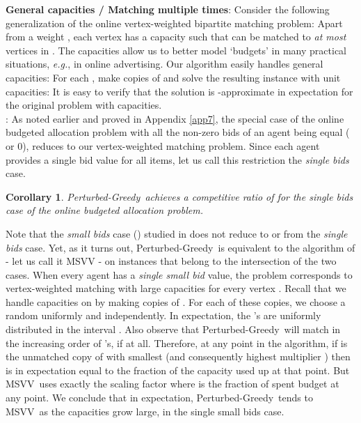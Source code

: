 \documentclass[11pt]{article}
\newtheorem{corollary}[theorem]{Corollary}
\newcommand{\MSVV}{MSVV}
\newcommand{\pgreedy}{{\sc Perturbed-Greedy}}
\begin{document}
\noindent \textbf{General capacities / Matching  multiple
  times}: Consider the following generalization of the online
vertex-weighted bipartite matching problem: Apart from a weight ,
each vertex  has a capacity  such that  can be
matched to \emph{at most}  vertices in . The capacities allow
us to better model `budgets' in many practical situations,
\textit{e.g.}, in online advertising. Our algorithm easily handles
general capacities: For each , make  copies of  and
solve the resulting instance with unit capacities: It is easy to
verify that the solution is -approximate
in expectation for the original problem with capacities.\\

: As noted earlier and proved in
Appendix \ref{app7}, the special case of the online budgeted
allocation problem with all the non-zero bids of an agent being equal
( or 0), reduces to our vertex-weighted matching
problem. Since each agent provides a single bid value for all items,
let us call this restriction the \emph{single bids} case.

\begin{corollary}
\pgreedy~achieves a competitive ratio of  for the \emph{single
  bids} case of the online budgeted allocation problem.
\end{corollary}

Note that the \emph{small bids} case () studied in
\cite{MSVV05, BJN07} does not reduce to or from the \emph{single bids}
case. Yet, as it turns out, \pgreedy~is equivalent to the algorithm of
\cite{MSVV05} - let us call it MSVV - on instances that belong to the
intersection of the two cases. When every agent has a \emph{single
  small bid} value, the problem corresponds to vertex-weighted
matching with large capacities  for every vertex . Recall that
we handle capacities on  by making  copies  of . For each of these copies, we choose a random
 uniformly and independently. In expectation, the
's are uniformly distributed in the interval . Also
observe that \pgreedy~will match  in the
increasing order of 's, if at all. Therefore, at any point in
the algorithm, if  is the unmatched copy of  with smallest
 (and consequently highest multiplier ) then
 is in expectation equal to the fraction of the capacity
 used up at that point. But \MSVV~uses exactly the scaling factor
 where  is the fraction of spent budget at any point. We
conclude that in expectation, \pgreedy~tends to \MSVV~as the
capacities grow large, in the single small bids case.
\end{document}

